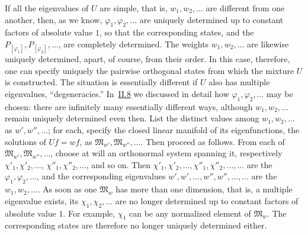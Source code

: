 \documentclass[fontsize=13pt,twoside,openany,headings=normal,parskip=false,bookmarkpackage=false,DIV=calc]{scrbook}
\begin{document}
If all the eigenvalues of $U$ are simple, that is, $w_1,w_2,\ldots$ are different from one another, then, as we know, $\varphi_1,\varphi_2,\ldots$ are uniquely determined up to constant factors of absolute value $1$, so that the corresponding states, and the $P_{[\varphi_1]},P_{[\varphi_2]},\ldots$, are completely determined. The weights $w_1,w_2,\ldots$ are likewise uniquely determined, apart, of course, from their order. In this case, therefore, one can specify uniquely the pairwise orthogonal states from which the mixture $U$ is constructed. The situation is essentially different if $U$ also has multiple eigenvalues, ``degeneracies.'' In~\hyperref[sec:II.8]{II.8} we discussed in detail how $\varphi_1,\varphi_2,\ldots$ may be chosen: there are infinitely many essentially different ways, although $w_1,w_2,\ldots$ remain uniquely determined even then. List the distinct values among $w_1,w_2,\ldots$ as $w',w'',\ldots$; for each, specify the closed linear manifold of its eigenfunctions, the solutions of $Uf=wf$, as $\mathfrak M_{w'},\mathfrak M_{w''},\ldots$. Then proceed as follows. From each of $\mathfrak M_{w'},\mathfrak M_{w''},\ldots$, choose at will an orthonormal system spanning it, respectively $\chi'_1,\chi'_2,\ldots$, $\chi''_1,\chi''_2,\ldots$, and so on. Then $\chi'_1,\chi'_2,\ldots,\chi''_1,\chi''_2,\ldots,\ldots$ are the $\varphi_1,\varphi_2,\ldots$, and the corresponding eigenvalues $w',w',\ldots,w'',w'',\ldots,\ldots$ are the $w_1,w_2,\ldots$. As soon as one $\mathfrak M_w$ has more than one dimension, that is, a multiple eigenvalue exists, its $\chi_1,\chi_2,\ldots$ are no longer determined up to constant factors of absolute value $1$. For example, $\chi_1$ can be any normalized element of $\mathfrak M_w$. The corresponding states are therefore no longer uniquely determined either.
\end{document}
